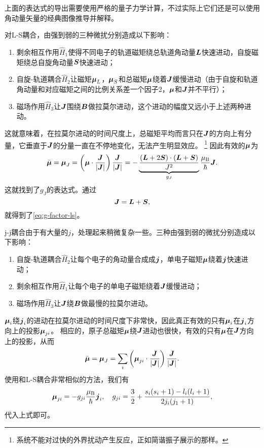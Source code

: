 \documentclass[UTF8, a4paper]{ctexart}
\begin{document}
上面的表达式的导出需要使用严格的量子力学计算，不过实际上它们还是可以使用角动量矢量的经典图像推导并解释。

对L-S耦合，由强到弱的三种微扰分别造成以下影响：

\begin{enumerate}
    \item 剩余相互作用$\hat{H}_1$使得不同电子的轨道磁矩绕总轨道角动量$\vb*{L}$快速进动，自旋磁矩绕总自旋角动量$\vb*{S}$快速进动；
    \item 自旋-轨道耦合$\hat{H}_2$让磁矩$\vb*{\mu}_L$，$\vb*{\mu}_S$和总磁矩$\vb*{\mu}$绕着$\vb*{J}$缓慢进动（由于自旋和轨道角动量和对应磁矩之间的比例关系差一个因子2，$\vb*{\mu}$和$\vb*{J}$并不平行）；
    \item 磁场作用$\hat{H}_3$让$\vb*{J}$围绕$\vb*{B}$做拉莫尔进动，这个进动的幅度又远小于上述两种进动。
\end{enumerate}

这就意味着，在拉莫尔进动的时间尺度上，总磁矩平均而言只在$\vb*{J}$的方向上有分量，它垂直于$\vb*{J}$的分量一直在不停地变化，无法产生明显效应。%
\footnote{系统不能对过快的外界扰动产生反应，正如简谐振子展示的那样。}%
因此有效的$\vb*{\mu}$为
\[
    \bar{\vb*{\mu}} = \vb*{\mu}_J = \left(\vb*{\mu} \cdot \frac{\vb*{J}}{\abs{\vb*{J}}}\right) \frac{\vb*{J}}{\abs{\vb*{J}}} = - \underbrace{\frac{(\vb*{L} + 2\vb*{S}) \cdot (\vb*{L} + \vb*{S})}{J^2}}_{g_J} \frac{\mu_\text{B}}{\hbar} \vb*{J}.
\]
这就找到了$g_J$的表达式。通过
\[
    \vb*{J} = \vb*{L} + \vb*{S},
\]
就得到了\eqref{eq:g-factor-ls}。

j-j耦合由于有大量的$j$，处理起来稍微复杂一些。三种由强到弱的微扰分别造成以下影响：
\begin{enumerate}
    \item 自旋-轨道耦合$\hat{H}_2$让每个电子的角动量合成成$\vb*{j}$，单电子磁矩$\vb*{\mu}$绕着$\vb*{j}$快速进动；
    \item 剩余相互作用$\hat{H}_1$让每个电子的单电子磁矩绕着$\vb*{J}$缓慢进动；
    \item 磁场作用$\hat{H}_3$让$\vb*{J}$绕$\vb*{B}$做最慢的拉莫尔进动。
\end{enumerate}
$\vb*{\mu}_i$绕$\vb*{j}_i$的进动在拉莫尔进动的时间尺度下非常快，因此真正有效的只有$\vb*{\mu}_i$在$\vb*{j}_i$方向上的投影$\vb*{\mu}_{j i}$。
相应的，原子总磁矩$\vb*{\mu}$绕$\vb*{J}$进动也很快，有效的只有$\vb*{\mu}$在$\vb*{J}$方向上的投影，从而
\[
    \bar{\vb*{\mu}} = \vb*{\mu}_J = \sum_i \left( \vb*{\mu}_{j i} \cdot \frac{\vb*{J}}{\abs{\vb*{J}}} \right) \frac{\vb*{J}}{\abs{\vb*{J}}}.
\]
使用和L-S耦合非常相似的方法，我们有
\begin{equation}
    \vb*{\mu}_{j i} = - g_{j i} \frac{\mu_\text{B}}{\hbar} \vb*{j}_i, \quad g_{j i} = \frac{3}{2} + \frac{s_i(s_i + 1) - l_i (l_i + 1)}{2 j_i (j_1 + 1)},
\end{equation}
代入上式即可。
\end{document}
